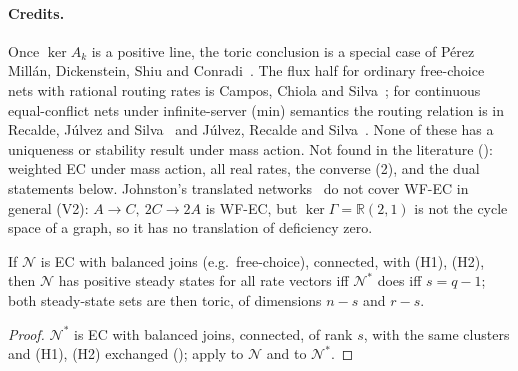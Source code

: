 \documentclass[11pt,a4paper]{report}
\newcommand{\Net}{\mathcal{N}}
\newcommand{\Nd}{\mathcal{N}^{*}}
\begin{document}
\paragraph{Credits.} Once \(\ker A_k\) is a positive line, the toric conclusion is a special case of Pérez Millán,
Dickenstein, Shiu and Conradi~\autocite[Thm~3.8, Cor.~3.12]{PerezMillan2012}. The flux half for ordinary free-choice
nets with rational routing rates is Campos, Chiola and Silva~\autocite[Lemma~5.1, Thms~5.3--5.4]{CamposChiolaSilva1991};
for continuous equal-conflict nets under infinite-server (min) semantics the routing relation is in Recalde, Júlvez
and Silva~\autocite{RecaldeJulvezSilva2002} and Júlvez, Recalde and Silva~\autocite[eq.~(18), Def.~7]{JulvezRecaldeSilva2005}.
None of these has a uniqueness or stability result under mass action. Not found in the literature
(): weighted EC under mass action, all real rates, the converse (2), and the dual statements below. Johnston's translated networks~\autocite{Johnston2014}
do not cover WF-EC in general (V2): \(A\to C,\ 2C\to2A\) is WF-EC, but \(\ker\Gamma=\mathbb{R}(2,1)\) is not the cycle
space of a graph, so it has no translation of deficiency zero.

\begin{corollary}\label{cor:Tbal}
If \(\Net\) is EC with balanced joins (e.g.\ free-choice), connected, with (H1), (H2), then \(\Net\) has positive steady
states for all rate vectors iff \(\Nd\) does iff \(s=q-1\); both steady-state sets are then toric, of dimensions
\(n-s\) and \(r-s\).
\end{corollary}
\begin{proof}
\(\Nd\) is EC with balanced joins, connected, of rank \(s\), with the same clusters and (H1), (H2) exchanged
(); apply  to \(\Net\) and to \(\Nd\).
\end{proof}
\end{document}
